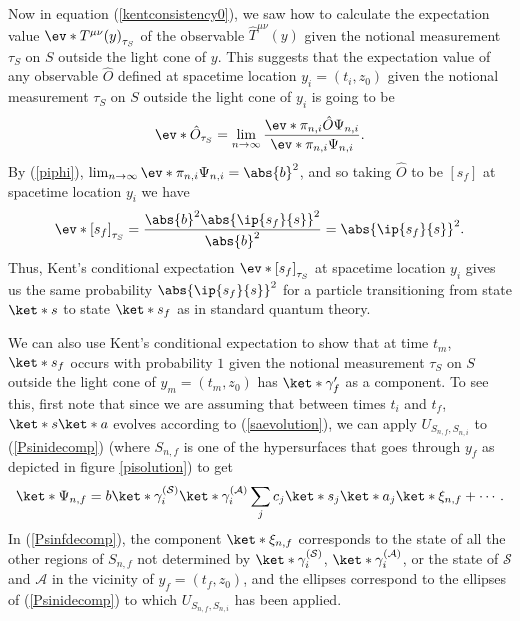\documentclass[12pt]{report}
\providecommand{\DIFaddbegin}{} %
\providecommand{\DIFaddend}{} %
\providecommand{\DIFdelbegin}{} %
\providecommand{\DIFdelend}{} %
\begin{document}
Now in equation (\ref{kentconsistency0}), we saw how to calculate the expectation value $\ev*{T^{\mu\nu}(y)}_{\tau_S}$ of the observable $\hat{T}^{\mu\nu}(y)$ given the notional measurement $\tau_S$ on $S$ outside the light cone of $y$. This suggests that the expectation value of any observable $\hat{O}$ defined at spacetime location $y_i=(t_i,z_0)$ given the notional measurement $\tau_S$ on $S$ outside the light cone of $y_i$ is going to be
\begin{equation}\label{kentevo}
\ev*{\hat{O}}_{\tau_S}=\lim_{n\rightarrow\infty}\frac{\ev*{\pi_{n,i}\hat{O}}{\Psi_{n,i}}}{\ev*{\pi_{n,i}}{\Psi_{n,i}}}.
\end{equation}
By (\ref{piphi}), $\lim_{n\rightarrow\infty}\ev*{\pi_{n,i}}{\Psi_{n,i}}=\abs{b}^2$, and so taking $\hat{O}$ to be $[s_f]$ at spacetime location $y_i$ we have 
$$ \ev*{[s_f]}_{\tau_S}=\frac{\abs{b}^2\abs{\ip{s_f}{s}}^2}{\abs{b}^2}=\abs{\ip{s_f}{s}}^2.$$
Thus, Kent's conditional expectation $\ev*{[s_f]}_{\tau_S}$ at spacetime location $y_i$ gives us the same probability $\abs{\ip{s_f}{s}}^2$ for a particle transitioning from state $\ket*{s}$ to state $\ket*{s_f}$ as in standard quantum theory.

We can also use Kent's conditional expectation to show that at time $t_m$, $\ket*{s_f}$ occurs with probability $1$ given the notional measurement $\tau_S$ on $S$ outside the light cone of $y_m=(t_m,z_0)$ has $\ket*{\gamma_f'}$ as a component. To see this, first note that since we are assuming that between times $t_i$ and $t_f$, $\ket*{s}\ket*{a}$ evolves according to (\ref{saevolution}), we can apply $U_{S_{n,f},S_{n,i}}$ to (\ref{Psinidecomp}) (where $S_{n,f}$ is one of the hypersurfaces that goes through $y_f$ as depicted in figure \ref{pisolution}) to get
\begin{equation}\label{Psinfdecomp}
	\ket*{\Psi_{n,f}}=b\ket*{\gamma_i^{(\mathcal{S})}}\ket*{\gamma_i^{(\mathcal{A})}}\sum_j c_j \ket*{s_j}\ket*{a_j}\ket*{\xi_{n,f}}+\cdots.
	\end{equation} 
In (\ref{Psinfdecomp}), the component $\ket*{\xi_{n,f}}$ %
\DIFdelbegin %
\DIFdelend \DIFaddbegin {}\DIFaddend %
corresponds to the state of all the other regions of $S_{n,f}$ not determined by $\ket*{\gamma_i^{(\mathcal{S})}}$, $\ket*{\gamma_i^{(\mathcal{A})}}$, or the state of $\mathcal{S}$ and $\mathcal{A}$ in the vicinity of $y_f=(t_f, z_0)$, and the ellipses correspond to the ellipses of (\ref{Psinidecomp}) to which $U_{S_{n,f},S_{n,i}}$ has been applied. 
\end{document}
